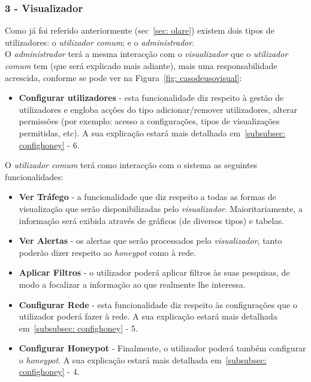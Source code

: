 \newcommand{\uticomum}{\emph{utilizador comum}\xspace} 
\newcommand{\admini}{\emph{administrador}\xspace} 
\newcommand{\visualz}{\emph{visualizador}\xspace}
\subsubsection{\textbf{3 - Visualizador}}

Como já foi referido anteriormente (sec~\ref{sec: olare}) existem dois tipos de utilizadores: o \uticomum; e o \admini.\\ 

O \admini terá a mesma interacção com o \visualz que o \uticomum tem (que será explicado mais adiante), mais uma responsabilidade acrescida, 
conforme se pode ver na Figura~\ref{fig: casodeusovisual}:

\begin{itemize}
 \item \textbf{Configurar utilizadores} - esta funcionalidade diz respeito à gestão de utilizadores e engloba acções do tipo adicionar/remover utilizadores, 
 alterar permissões (por exemplo: acesso a configurações, tipos de visualizações permitidas, etc). A sua explicação estará mais detalhada em~\ref{subsubsec: confighoney} - 6.
\end{itemize}

O \uticomum terá como interacção com o sistema as seguintes funcionalidades:

\begin{itemize}
 \item \textbf{Ver Tráfego} - a funcionalidade que diz respeito a todas as formas de visualização que serão disponibilizadas pelo \visualz. Maioritariamente, a informação será exibida através de gráficos (de diversos tipos) e tabelas.
 \item \textbf{Ver Alertas} - os alertas que serão processados pelo \visualz, tanto poderão dizer respeito ao \emph{honeypot} como à rede.
 \item \textbf{Aplicar Filtros} - o utilizador poderá aplicar filtros às suas pesquisas, de modo a focalizar a informação ao que realmente lhe interessa.
 \item \textbf{Configurar Rede} - esta funcionalidade diz respeito às configurações que o utilizador poderá fazer à rede. A sua explicação estará mais detalhada em~\ref{subsubsec: confighoney} - 5.
 \item \textbf{Configurar Honeypot} - Finalmente, o utilizador poderá também configurar o \emph{honeypot}. A sua explicação estará mais detalhada em~\ref{subsubsec: confighoney} - 4.
\end{itemize}

